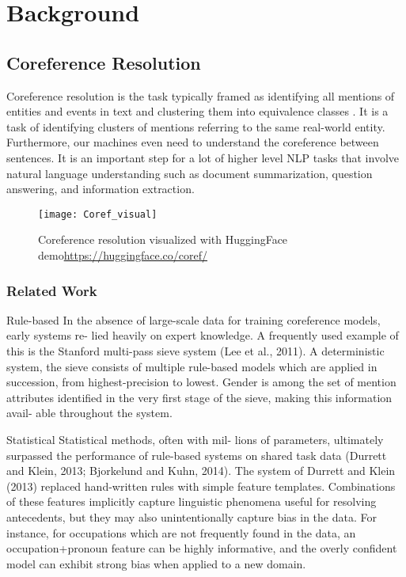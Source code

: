 \chapter{Background}
 
\section{Coreference Resolution}
Coreference resolution is the task typically framed as identifying all mentions of entities and events in text and clustering them into equivalence classes . It is a task of identifying clusters of mentions referring to the same real-world entity. Furthermore, our machines even need to understand the coreference between sentences. It is an important step for a lot of higher level NLP tasks that involve natural language understanding such as document summarization, question answering, and information extraction.

\begin{figure}[H]
	\centering
	\texttt{[image: Coref\_visual]}
	\caption{Coreference resolution visualized with HuggingFace demo\url{https://huggingface.co/coref/}}
\end{figure}

\subsection{Related Work}

Rule-based In the absence of large-scale data for training coreference models, early systems re- lied heavily on expert knowledge. A frequently used example of this is the Stanford multi-pass sieve system (Lee et al., 2011). A deterministic system, the sieve consists of multiple rule-based models which are applied in succession, from highest-precision to lowest. Gender is among the set of mention attributes identified in the very first stage of the sieve, making this information avail- able throughout the system.

Statistical Statistical methods, often with mil- lions of parameters, ultimately surpassed the performance of rule-based systems on shared task data (Durrett and Klein, 2013; Bjorkelund and Kuhn, 2014). The system of Durrett and Klein (2013) replaced hand-written rules with simple feature templates. Combinations of these features implicitly capture linguistic phenomena useful for resolving antecedents, but they may also unintentionally capture bias in the data. For instance, for occupations which are not frequently found in the data, an occupation+pronoun feature can be highly informative, and the overly confident model can exhibit strong bias when applied to a new domain.

